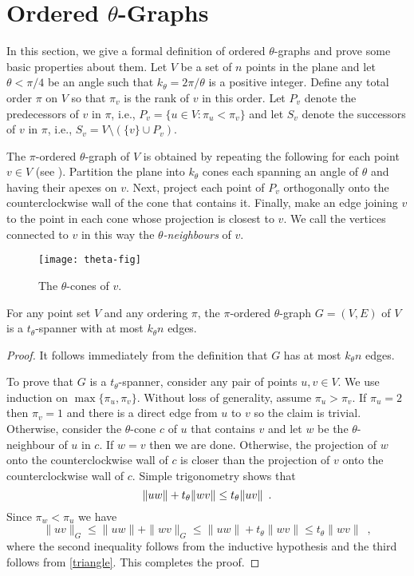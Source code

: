 \documentclass{elsart}
\begin{document}
\section{Ordered $\theta$-Graphs}

In this section, we give a formal definition of ordered
$\theta$-graphs and prove some basic properties about them.  Let $V$
be a set of $n$ points in the plane and let $\theta<\pi/4$ be an angle
such that $k_\theta=2\pi/\theta$ is a positive integer.  Define any
total order $\pi$ on $V$ so that $\pi_v$ is the rank of $v$ in this
order.  Let $P_v$ denote the predecessors of $v$ in $\pi$, i.e.,
$P_v=\{u\in V:\pi_u<\pi_v\}$ and let $S_v$ denote the successors of
$v$ in $\pi$, i.e., $S_v=V\setminus(\{v\}\cup P_v)$.

The $\pi$-ordered $\theta$-graph of $V$ is obtained by repeating the
following for each point $v\in V$ (see ).
Partition the plane into $k_\theta$ cones each spanning an angle of
$\theta$ and having their apexes on $v$.  Next, project each point of
$P_v$ orthogonally onto the counterclockwise wall of the cone that
contains it.  Finally, make an edge joining $v$ to the point in each
cone whose projection is closest to $v$.  We call the vertices
connected to $v$ in this way the \emph{$\theta$-neighbours} of $v$. 

\begin{figure}
\begin{center}\texttt{[image: theta-fig]}\end{center}
\caption{The $\theta$-cones of $v$.}
\end{figure}

\begin{lem}
For any point set $V$ and any ordering $\pi$, the $\pi$-ordered
$\theta$-graph $G=(V,E)$ of $V$ is a $t_\theta$-spanner with at most
$k_\theta n$ edges.
\end{lem}

\begin{proof}
It follows immediately from the definition that $G$ has at most
$k_\theta n$ edges.

To prove that $G$ is a $t_\theta$-spanner, consider any pair of points
$u,v\in V$.  We use induction on $\max\{\pi_u,\pi_v\}$.  Without loss
of generality, assume $\pi_u>\pi_v$.  If $\pi_u=2$ then $\pi_v=1$ and
there is a direct edge from $u$ to $v$ so the claim is trivial.
Otherwise, consider the $\theta$-cone $c$ of $u$ that contains $v$ and
let $w$ be the $\theta$-neighbour of $u$ in $c$.  If $w=v$ then we are done.
Otherwise, the projection of $w$ onto the counterclockwise wall of $c$
is closer than the projection of $v$ onto the counterclockwise wall of
$c$.  Simple trigonometry shows that
\begin{equation}
  \|uw\| + t_\theta\|wv\| \le t_\theta\|uv\| \enspace .
  \eqlabel{triangle}
\end{equation}
Since $\pi_w<\pi_u$ we have 
\[
   \|uv\|_G\le \|uw\| + \|wv\|_G \le \|uw\| + t_\theta\|wv\| \le t_\theta\|wv\| \enspace ,
\]
where the second inequality follows from the inductive hypothesis and
the third follows from \eqref{triangle}.  This completes the proof.
\end{proof}
\end{document}
